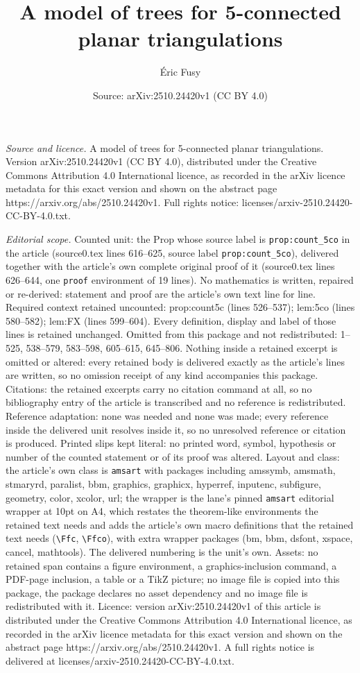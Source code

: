 \documentclass[10pt,a4paper]{amsart}
\title[A model of trees for 5-connected planar triangulations]{A model of trees for 5-connected planar triangulations}
\author{\'Eric Fusy}
\date{Source: arXiv:2510.24420v1 (CC BY 4.0)}
\begin{document}
\maketitle

\noindent\emph{Source and licence.} A model of trees for 5-connected planar triangulations. Version arXiv:2510.24420v1 (CC BY 4.0), distributed under the Creative Commons Attribution 4.0 International licence, as recorded in the arXiv licence metadata for this exact version and shown on the abstract page https://arxiv.org/abs/2510.24420v1. Full rights notice: licenses/arxiv-2510.24420-CC-BY-4.0.txt.\par\smallskip

\noindent\textit{Editorial scope.} Counted unit: the Prop whose source label is \texttt{prop:count\_5co} in the article (source0.tex lines 616--625, source label \texttt{prop:count\_5co}), delivered together with the article's own complete original proof of it (source0.tex lines 626--644, one \texttt{proof} environment of 19 lines). No mathematics is written, repaired or re-derived: statement and proof are the article's own text line for line. Required context retained uncounted: prop:count5c (lines 526--537); lem:5co (lines 580--582); lem:FX (lines 599--604). Every definition, display and label of those lines is retained unchanged. Omitted from this package and not redistributed: 1--525, 538--579, 583--598, 605--615, 645--806. Nothing inside a retained excerpt is omitted or altered: every retained body is delivered exactly as the article's lines are written, so no omission receipt of any kind accompanies this package. Citations: the retained excerpts carry no citation command at all, so no bibliography entry of the article is transcribed and no reference is redistributed. Reference adaptation: none was needed and none was made; every reference inside the delivered unit resolves inside it, so no unresolved reference or citation is produced. Printed slips kept literal: no printed word, symbol, hypothesis or number of the counted statement or of its proof was altered. Layout and class: the article's own class is \texttt{amsart} with packages including amssymb, amsmath, stmaryrd, paralist, bbm, graphics, graphicx, hyperref, inputenc, subfigure, geometry, color, xcolor, url; the wrapper is the lane's pinned \texttt{amsart} editorial wrapper at 10pt on A4, which restates the theorem-like environments the retained text needs and adds the article's own macro definitions that the retained text needs (\texttt{\textbackslash Ffc}, \texttt{\textbackslash Ffco}), with extra wrapper packages (bm, bbm, dsfont, xspace, cancel, mathtools). The delivered numbering is the unit's own. Assets: no retained span contains a figure environment, a graphics-inclusion command, a PDF-page inclusion, a table or a TikZ picture; no image file is copied into this package, the package declares no asset dependency and no image file is redistributed with it. Licence: version arXiv:2510.24420v1 of this article is distributed under the Creative Commons Attribution 4.0 International licence, as recorded in the arXiv licence metadata for this exact version and shown on the abstract page https://arxiv.org/abs/2510.24420v1. A full rights notice is delivered at licenses/arxiv-2510.24420-CC-BY-4.0.txt. 
\end{document}
